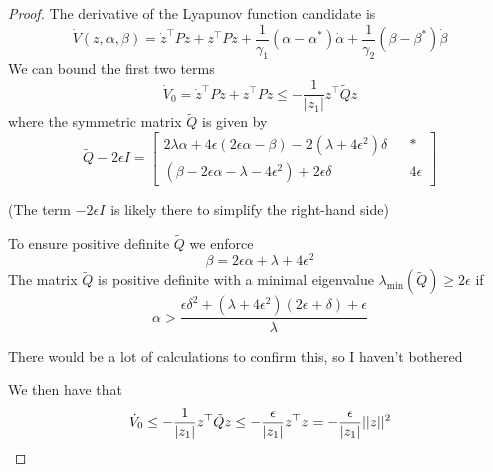 \begin{proof}
        The derivative of the Lyapunov function candidate is
       \begin{equation}
        \dot{V}(z, \alpha, \beta) = \dot{z}^\top P z + z^\top P \dot{z} + \frac{1}{\gamma_1}\left(\alpha - \alpha^*\right)\dot{\alpha} + \frac{1}{\gamma_2} \left(\beta - \beta^*\right)\dot{\beta}
       \end{equation}
       We can bound the first two terms
       \begin{equation}
        \dot{V}_0 = \dot{z}^\top P z + z^\top P \dot{z} \leq -\frac{1}{|z_1|}z^\top\tilde{Q}z
       \end{equation}
       where the symmetric matrix $\tilde{Q}$ is given by
       \begin{equation}
        \tilde{Q} - 2\epsilon I = 
        \begin{bmatrix}
          2\lambda\alpha + 4\epsilon\left(2\epsilon\alpha - \beta \right) - 2\left(\lambda + 4\epsilon^2\right)\delta && * \\
          \left(\beta - 2\epsilon\alpha - \lambda - 4\epsilon^2\right) + 2\epsilon\delta && 4\epsilon 
        \end{bmatrix}
       \end{equation}
       \begin{rmk}
        (The term $- 2\epsilon I$ is likely there to simplify the right-hand side)
       \end{rmk}
       To ensure positive definite $\tilde{Q}$ we enforce
        \begin{equation}
          \beta = 2\epsilon\alpha + \lambda + 4\epsilon^2
        \end{equation}
        The matrix $\tilde{Q}$ is positive definite with a minimal eigenvalue $\lambda_{\text{min}}(\tilde{Q}) \geq 2\epsilon$ if 
        \begin{equation}
          \alpha > \frac{\epsilon\delta^2 + \left(\lambda + 4\epsilon^2\right)\left(2\epsilon + \delta\right) + \epsilon}{\lambda}
          \label{eq:shtessel-inequality-19}
        \end{equation}
        \begin{rmk}
            There would be a lot of calculations to confirm this, so I haven't bothered
        \end{rmk}
        We then have that
        \begin{equation}
          \dot{V}_0 \leq - \frac{1}{|z_1|}z^\top\tilde{Q}z \leq - \frac{\epsilon}{|z_1|}z^\top z = - \frac{\epsilon}{|z_1|}\lvert\lvert z\rvert\rvert^2
        \end{equation}

\end{proof}

